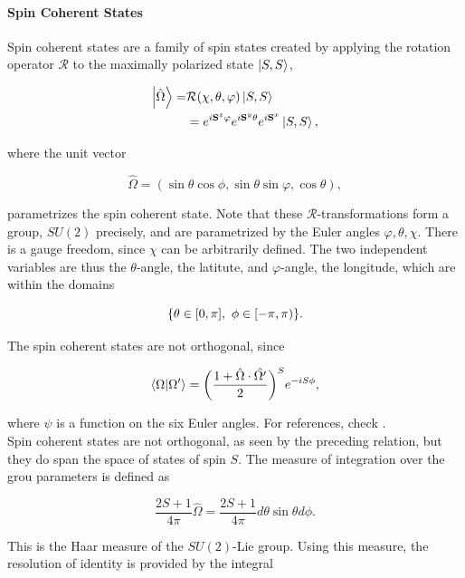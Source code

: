 \documentclass{homework}
\begin{document}
\paragraph{Spin Coherent States}

Spin coherent states are a family of spin states created by applying the rotation operator $\mathcal{R}$ to the maximally polarized state $\ket{S,S}$,

\begin{equation}
\begin{split}
    \ket{\hat{\Omega}} =& \mathcal{R}(\chi, \theta, \varphi) \ket{S,S} \\
    &= e^{i{\bf S}^z \varphi} e^{i {\bf S}^y \theta} e^{i {\bf S}^x} \ket{S,S},
\end{split}
\end{equation}

where the unit vector 

\begin{equation}
    \hat{\Omega} = (\sin \theta \cos \phi, \sin \theta \sin \varphi, \cos \theta),
\end{equation}

parametrizes the spin coherent state. Note that these $\mathcal{R}$-transformations form a group, $SU(2)$ precisely, and are parametrized by the Euler angles $\varphi, \theta, \chi$. There is a gauge freedom, since $\chi$ can be arbitrarily defined. The two independent variables are thus the $\theta$-angle, the latitute, and $\varphi$-angle, the longitude, which are within the domains 

$$
    \{\theta \in [0, \pi], \textnormal{ } \phi \in [-\pi, \pi) \}.
$$

The spin coherent states are not orthogonal, since 

$$
    \bra{\Omega} \ket{\Omega'} = \bigg(\frac{1+\hat{\Omega} \cdot \hat{\Omega'}}{2}\bigg)^S e^{-iS\phi},
$$

where $\psi$ is a function on the six Euler angles. For references, check \cite{assa}. \\

Spin coherent states are not orthogonal, as seen by the preceding relation, but they do span the space of states of spin $S$. The measure of integration over the grou parameters is defined as 

\begin{equation}
    \frac{2S+1}{4\pi} \hat{\Omega} = \frac{2S+1}{4\pi} d\theta \sin \theta d\phi.
\end{equation}

This is the Haar measure of the $SU(2)$-Lie group. Using this measure, the resolution of identity is provided by the integral
\end{document}
